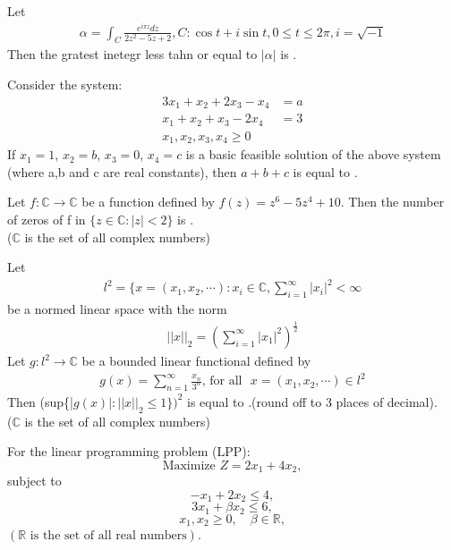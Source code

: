 \vspace{0.5cm}

\item Let 
\begin{align*}
    \alpha =\int_{C}\frac{e^{i\pi z}dz}{2z^2-5z+2}, C:\cos{t}+i\sin{t}, 0\leq t \leq 2\pi,i=\sqrt{-1}
\end{align*}
Then the gratest inetegr less tahn or equal to $|\alpha|$ is \underline{\hspace{1cm}}.
\vspace{0.5cm}
\item Consider the system:
\begin{align*}
    3x_1+x_2+2x_3-x_4&=a\\
    x_1+x_2+x_3-2x_4&=3\\
    x_1,x_2,x_3,x_4\geq 0
\end{align*}
If $x_1=1$, $x_2=b$, $x_3=0$, $x_4=c$ is a basic feasible solution of the above system (where a,b and c are real constants), then $a+b+c$ is equal to \underline{\hspace{1cm}}.
\vspace{0.5cm}

\item Let $f:\mathbb{C}\rightarrow \mathbb{C}$ be a function defined by $f(z)=z^6-5z^4+10$. Then the number of zeros of f in $\{z\in \mathbb{C}:|z|<2\}$ is \underline{\hspace{1cm}}.\\ ($\mathbb{C}$ is the set of all complex numbers)
\vspace{0.5cm}
\item Let 
\begin{align*}
    l^2=\{x=(x_1,x_2,\cdots):x_i\in\mathbb{C},\sum_{i=1}^\infty|x_i|^2<\infty
\end{align*}
be a normed linear space with the norm
\begin{align*}
    ||x||_{2}=(\sum_{i=1}^\infty|x_1|^2)^{\frac{1}{2}}
\end{align*}
Let $g:l^2\rightarrow \mathbb{C}$ be a bounded linear functional defined by 
\begin{align*}
    g(x)=\sum_{n=1}^\infty\frac{x_n}{3^n}\text{, } \text{for all}\text{ } x=(x_1,x_2,\cdots)\in l^2
\end{align*}
Then (sup\{|$g(x)|:||x||_2\leq1\})^2$ is equal to \underline{\hspace{1cm}}.(round off to 3 places of decimal).\\($\mathbb{C}$ is the set of all complex numbers)
\vspace{0.5cm}
\item For the linear programming problem (LPP): 
\[
\text{Maximize } Z = 2x_1 + 4x_2,
\]
subject to
\[
- x_1 + 2x_2 \leq 4,
\]
\[
3x_1 + \beta x_2 \leq 6,
\]
\[
x_1, x_2 \geq 0, \quad \beta \in \mathbb{R},
\]
\((\mathbb{R} \text{ is the set of all real numbers})\).


